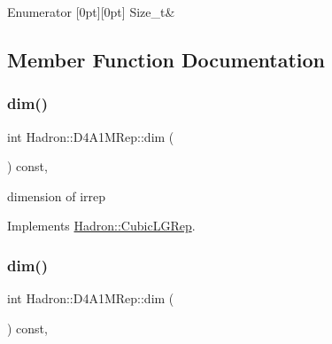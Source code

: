 \begin{DoxyEnumFields}{Enumerator}
[0pt][0pt]{}\mbox{\label{structHadron_1_1D4A1MRep_a9dfde53e7d037b4ac1eee0f174d6b361aa0cd2661050a0a1980d0876c05923299}} 
Size\+\_\+t&\\
\hline

\end{DoxyEnumFields}


\subsection{Member Function Documentation}
\mbox{\label{structHadron_1_1D4A1MRep_ae14f6a295b89553d56114e5727e631da}} 
\subsubsection{\texorpdfstring{dim()}{dim()}\hspace{0.1cm}{\footnotesize\ttfamily [1/3]}}
{\footnotesize\ttfamily int Hadron\+::\+D4\+A1\+M\+Rep\+::dim (\begin{DoxyParamCaption}{ }\end{DoxyParamCaption}) const\hspace{0.3cm}{\ttfamily [inline]}, {\ttfamily [virtual]}}

dimension of irrep 

Implements \mbox{\hyperlink{structHadron_1_1CubicLGRep_a3acbaea26503ed64f20df693a48e4cdd}{Hadron\+::\+Cubic\+L\+G\+Rep}}.

\mbox{\label{structHadron_1_1D4A1MRep_ae14f6a295b89553d56114e5727e631da}} 
\subsubsection{\texorpdfstring{dim()}{dim()}\hspace{0.1cm}{\footnotesize\ttfamily [2/3]}}
{\footnotesize\ttfamily int Hadron\+::\+D4\+A1\+M\+Rep\+::dim (\begin{DoxyParamCaption}{ }\end{DoxyParamCaption}) const\hspace{0.3cm}{\ttfamily [inline]}, {\ttfamily [virtual]}}

